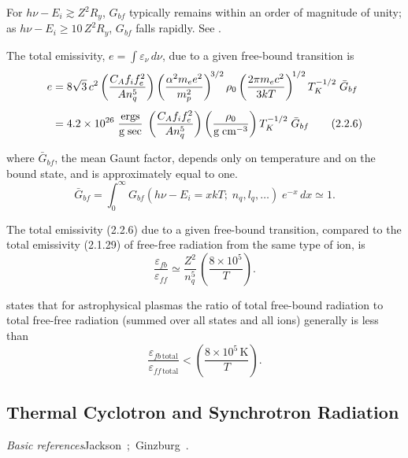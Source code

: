 For $h\nu - E_i \gtrsim Z^2 R_y$, $G_{bf}$ typically remains within an order of magnitude of
unity; as $h\nu - E_i \geq 10\,Z^2 R_y$, $G_{bf}$ falls rapidly.
See \citet{Karzas1961}.

The total emissivity, $e = \int \varepsilon_\nu\,d\nu$, due to a given free-bound transition is
\begin{align}
e &= 8\sqrt{3}\,c^2
\left(\frac{C_A f_i f_e^2}{An_q^5}\right)
\left(\frac{\alpha^2 m_e e^2}{m_p^2}\right)^{\!3/2}
\rho_0
\left(\frac{2\pi m_e c^2}{3kT}\right)^{\!1/2}
T_K^{-1/2}\;\bar{G}_{bf}
\notag\\[4pt]
&= 4.2 \times 10^{26}\;
\frac{\text{ergs}}{\text{g\;sec}}\;
\left(\frac{C_A f_i f_e^2}{An_q^5}\right)
\left(\frac{\rho_0}{\text{g\;cm}^{-3}}\right)
T_K^{-1/2}\;\bar{G}_{bf}
\tag{2.2.6}
\end{align}

where $\bar{G}_{bf}$, the mean Gaunt factor, depends only on temperature and on the
bound state, and is approximately equal to one.
\begin{equation}
\bar{G}_{bf} = \int_0^\infty G_{bf}(h\nu - E_i = xkT;\;n_q, l_q, \ldots)\;e^{-x}\,dx \simeq 1.
\tag{2.2.7}
\end{equation}

The total emissivity (2.2.6) due to a given free-bound transition, compared
to the total emissivity (2.1.29) of free-free radiation from the same type of ion,
is
\begin{equation}
\frac{\varepsilon_{fb}}{\varepsilon_{ff}}
\simeq \frac{Z^2}{n_q^5}\,
\left(\frac{8 \times 10^5}{T}\right).
\tag{2.2.8}
\end{equation}

\citet{Ginzburg1967} states that for astrophysical plasmas the ratio of total free-bound
radiation to total free-free radiation (summed over all states and all ions)
generally is less than
\begin{equation}
\frac{\varepsilon_{fb\,\text{total}}}{\varepsilon_{ff\,\text{total}}}
< \left(\frac{8 \times 10^5\,\text{K}}{T}\right).
\tag{2.2.9}
\end{equation}

\subsection{Thermal Cyclotron and Synchrotron Radiation}
\label{sec:2.3}

\textit{Basic references}\quad Jackson~\cite{Jackson1962};\
Ginzburg~\cite{Ginzburg1967}.

